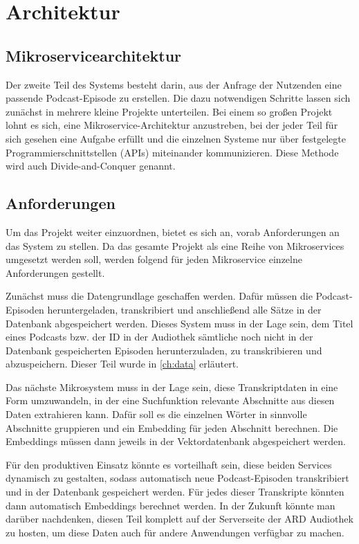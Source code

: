 \chapter{Architektur}\label{ch:method}

\section{Mikroservicearchitektur}

Der zweite Teil des Systems besteht darin, aus der Anfrage der Nutzenden eine passende Podcast-Episode zu erstellen.
Die dazu notwendigen Schritte lassen sich zunächst in mehrere kleine Projekte unterteilen.
Bei einem so großen Projekt lohnt es sich, eine Mikroservice-Architektur anzustreben, bei der jeder Teil für sich gesehen eine Aufgabe erfüllt und die einzelnen Systeme nur über festgelegte Programmierschnittstellen (APIs) miteinander kommunizieren.
Diese Methode wird auch Divide-and-Conquer genannt.

\section{Anforderungen}

Um das Projekt weiter einzuordnen, bietet es sich an, vorab Anforderungen an das System zu stellen.
Da das gesamte Projekt als eine Reihe von Mikroservices umgesetzt werden soll, werden folgend für jeden Mikroservice einzelne Anforderungen gestellt.

Zunächst muss die Datengrundlage geschaffen werden.
Dafür müssen die Podcast-Episoden heruntergeladen, transkribiert und anschließend alle Sätze in der Datenbank abgespeichert werden.
Dieses System muss in der Lage sein, dem Titel eines Podcasts bzw. der ID in der Audiothek sämtliche noch nicht in der Datenbank gespeicherten Episoden herunterzuladen, zu transkribieren und abzuspeichern.
Dieser Teil wurde in \autoref{ch:data} erläutert.

Das nächste Mikrosystem muss in der Lage sein, diese Transkriptdaten in eine Form umzuwandeln, in der eine Suchfunktion relevante Abschnitte aus diesen Daten extrahieren kann.
Dafür soll es die einzelnen Wörter in sinnvolle Abschnitte gruppieren und ein Embedding für jeden Abschnitt berechnen.
Die Embeddings müssen dann jeweils in der Vektordatenbank abgespeichert werden.

Für den produktiven Einsatz könnte es vorteilhaft sein, diese beiden Services dynamisch zu gestalten, sodass automatisch neue Podcast-Episoden transkribiert und in der Datenbank gespeichert werden.
Für jedes dieser Transkripte könnten dann automatisch Embeddings berechnet werden.
In der Zukunft könnte man darüber nachdenken, diesen Teil komplett auf der Serverseite der ARD Audiothek zu hosten, um diese Daten auch für andere Anwendungen verfügbar zu machen.

